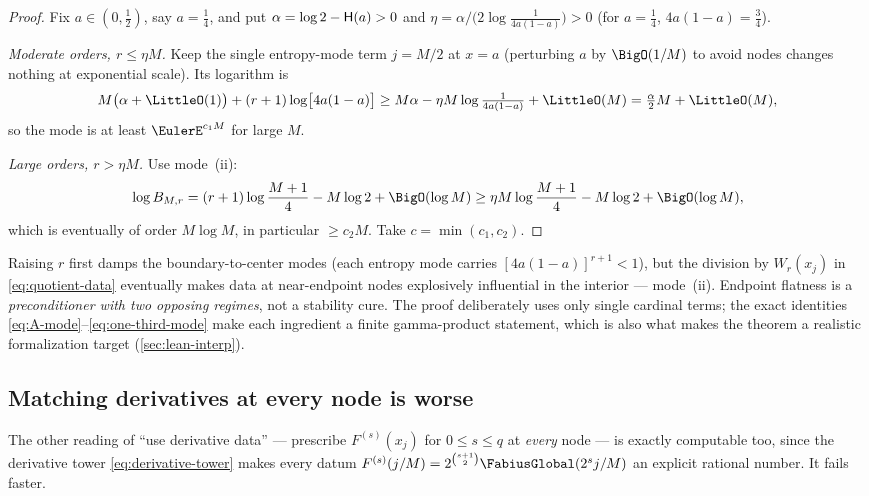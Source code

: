 \begin{proof}
Fix $a\in(0,\tfrac12)$, say $a=\tfrac14$, and put
$\alpha=\log2-\mathsf H(a)>0$ and
$\eta=\alpha/\bigl(2\log\tfrac1{4a(1-a)}\bigr)>0$ (for
$a=\tfrac14$, $4a(1-a)=\tfrac34$).

\emph{Moderate orders, $r\le\eta M$.}  Keep the single entropy-mode
term $j=M/2$ at $x=a$ (perturbing $a$ by $\BigO(1/M)$ to avoid nodes
changes nothing at exponential scale).  Its logarithm is
\[
 M\bigl(\alpha+\LittleO(1)\bigr)
 +(r+1)\log\bigl[4a(1-a)\bigr]
 \ge M\alpha-\eta M\log\tfrac1{4a(1-a)}+\LittleO(M)
 =\tfrac{\alpha}2M+\LittleO(M),
\]
so the mode is at least $\EulerE^{c_1M}$ for large $M$.

\emph{Large orders, $r>\eta M$.}  Use mode~(ii):
\[
 \log B_{M,r}
 =(r+1)\log\frac{M+1}{4}-M\log2+\BigO(\log M)
 \ge \eta M\log\frac{M+1}{4}-M\log2+\BigO(\log M),
\]
which is eventually of order $M\log M$, in particular
$\ge c_2M$.  Take $c=\min(c_1,c_2)$.
\end{proof}

\begin{remark}
Raising $r$ first damps the boundary-to-center modes (each entropy
mode carries $[4a(1-a)]^{r+1}<1$), but the division by
$W_r(x_j)$ in \eqref{eq:quotient-data} eventually makes data at
near-endpoint nodes explosively influential in the interior ---
mode~(ii).  Endpoint flatness is a \emph{preconditioner with two
opposing regimes}, not a stability cure.  The proof deliberately uses
only single cardinal terms; the exact identities
\eqref{eq:A-mode}--\eqref{eq:one-third-mode} make each ingredient a
finite gamma-product statement, which is also what makes the theorem
a realistic formalization target
(\cref{sec:lean-interp}).
\end{remark}

\subsection{Matching derivatives at every node is worse}
\label{sec:full-hermite}

The other reading of ``use derivative data'' --- prescribe
$F^{(s)}(x_j)$ for $0\le s\le q$ at \emph{every} node --- is exactly
computable too, since the derivative tower \eqref{eq:derivative-tower}
makes every datum $F^{(s)}(j/M)=2^{\binom{s+1}2}
\FabiusGlobal(2^{s}j/M)$ an explicit rational number.  It fails faster.

